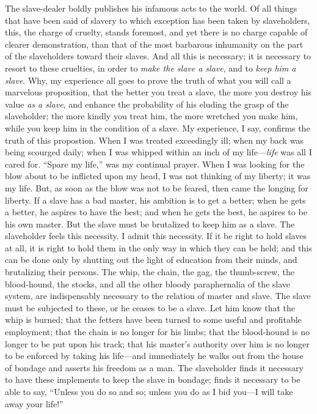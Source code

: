 The slave-dealer boldly publishes his infamous acts to the world. Of all
things that have been said of slavery to which exception has been taken
by slaveholders, this, the charge of cruelty, stands foremost, and yet
there is no charge capable of clearer demonstration, than that of the
most barbarous inhumanity on the part of the
{\protect\hypertarget{411}{}{}}slaveholders toward their slaves. And all
this is necessary; it is necessary to resort to these cruelties, in
order to \emph{make the slave a slave}, and to \emph{keep him a slave}.
Why, my experience all goes to prove the truth of what you will call a
marvelous proposition, that the better you treat a slave, the more you
destroy his value \emph{as a slave}, and enhance the probability of his
eluding the grasp of the slaveholder; the more kindly you treat him, the
more wretched you make him, while you keep him in the condition of a
slave. My experience, I say, confirms the truth of this propostion. When
I was treated exceedingly ill; when my back was being scourged daily;
when I was whipped within an inch of my life---\emph{life} was all I
cared for. ``Spare my life,'' was my continual prayer. When I was
looking for the blow about to be inflicted upon my head, I was not
thinking of my liberty; it was my life. But, as soon as the blow was not
to be feared, then came the longing for liberty. If a slave has a bad
master, his ambition is to get a better; when he gets a better, he
aspires to have the best; and when he gets the best, he aspires to be
his own master. But the slave must be brutalized to keep him as a slave.
The slaveholder feels this necessity. I admit this necessity. If it be
right to hold slaves at all, it is right to hold them in the only way in
which they can be held; and this can be done only by shutting out the
light of education from their minds, and brutalizing their persons. The
whip, the chain, the gag, the thumb-screw, the blood-hound, the stocks,
and all the other bloody paraphernalia of the slave system, are
indispensably necessary to the relation of master and slave. The slave
must be subjected to these, or he ceases to be a slave. Let him know
that the whip is burned; that the fetters have been turned to some
useful and profitable employment; that the chain is no longer for his
limbs; that the blood-hound is no longer to be put upon his track; that
his master's authority over him is no longer to be enforced by taking
his life---and immediately he walks out from the house of bondage and
asserts his freedom as a man. The slaveholder finds it necessary to have
these implements to keep the slave in bondage; finds it necessary to be
able to say, ``Unless you do so and so; unless you do as I bid you---I
will take away your life!''

